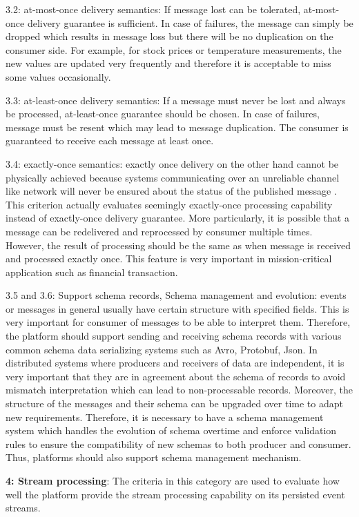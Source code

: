 3.2: at-most-once delivery semantics: If message lost can be tolerated, at-most-once delivery guarantee is sufficient. In case of failures, the message can simply be dropped which results in message loss but there will be no duplication on the consumer side. For example, for stock prices or temperature measurements, the new values are updated very frequently and therefore it is acceptable to miss some values occasionally. 

3.3: at-least-once delivery semantics: If a message must never be lost and always be processed, at-least-once guarantee should be chosen. In case of failures, message must be resent which may lead to message duplication. The consumer is guaranteed to receive each message at least once. 

3.4: exactly-once semantics: exactly once delivery on the other hand cannot be physically achieved because systems communicating over an unreliable channel like network will never be ensured about the status of the published message \cite{exactlyoncenotpossible}. This criterion actually evaluates seemingly exactly-once processing capability instead of exactly-once delivery guarantee. More particularly, it is possible that a message can be redelivered and reprocessed by consumer multiple times. However, the result of processing should be the same as when message is received and processed exactly once. This feature is very important in mission-critical application such as financial transaction.

3.5 and 3.6: Support schema records, Schema management and evolution: events or messages in general usually have certain structure with specified fields. This is very important for consumer of messages to be able to interpret them. Therefore, the platform should support sending and receiving schema records with various common schema data serializing systems such as Avro, Protobuf, Json. 
In distributed systems where producers and receivers of data are independent, it is very important that they are in agreement about the schema of records to avoid mismatch interpretation which can lead to non-processable records. Moreover, the structure of the messages and their schema can be upgraded over time to adapt new requirements. Therefore, it is necessary to have a schema management system which handles the evolution of schema overtime and enforce validation rules to ensure the compatibility of new schemas to both producer and consumer. Thus, platforms should also support schema management mechanism.

\textbf{4: Stream processing}: The criteria in this category are used to evaluate how well the platform provide the stream processing capability on its persisted event streams.

